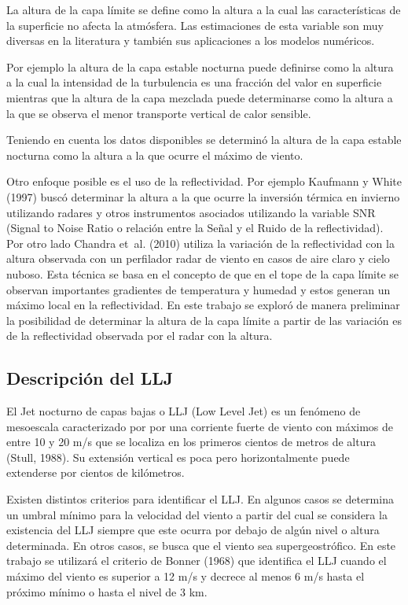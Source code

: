 \documentclass[12pt,spanish,oneside, a4paper]{book}
\begin{document}
La altura de la capa límite se define como la altura a la cual las
características de la superficie no afecta la atmósfera. Las
estimaciones de esta variable son muy diversas en la literatura y
también sus aplicaciones a los modelos numéricos.

Por ejemplo la altura de la capa estable nocturna puede definirse como
la altura a la cual la intensidad de la turbulencia es una fracción del
valor en superficie mientras que la altura de la capa mezclada puede
determinarse como la altura a la que se observa el menor transporte
vertical de calor sensible.

Teniendo en cuenta los datos disponibles se determinó la altura de la
capa estable nocturna como la altura a la que ocurre el máximo de
viento.

Otro enfoque posible es el uso de la reflectividad. Por ejemplo Kaufmann
y White (1997) buscó determinar la altura a la que ocurre la inversión
térmica en invierno utilizando radares y otros instrumentos asociados
utilizando la variable SNR (Signal to Noise Ratio o relación entre la
Señal y el Ruido de la reflectividad). Por otro lado Chandra et~al.
(2010) utiliza la variación de la reflectividad con la altura observada
con un perfilador radar de viento en casos de aire claro y cielo nuboso.
Esta técnica se basa en el concepto de que en el tope de la capa límite
se observan importantes gradientes de temperatura y humedad y estos
generan un máximo local en la reflectividad. En este trabajo se exploró
de manera preliminar la posibilidad de determinar la altura de la capa
límite a partir de las variación es de la reflectividad observada por el
radar con la altura.

\subsection{Descripción del LLJ}\label{descripcion-del-llj}

El Jet nocturno de capas bajas o LLJ (Low Level Jet) es un fenómeno de
mesoescala caracterizado por por una corriente fuerte de viento con
máximos de entre 10 y 20 m/s que se localiza en los primeros cientos de
metros de altura (Stull, 1988). Su extensión vertical es poca pero
horizontalmente puede extenderse por cientos de kilómetros.

Existen distintos criterios para identificar el LLJ. En algunos casos se
determina un umbral mínimo para la velocidad del viento a partir del
cual se considera la existencia del LLJ siempre que este ocurra por
debajo de algún nivel o altura determinada. En otros casos, se busca que
el viento sea supergeostrófico. En este trabajo se utilizará el criterio
de Bonner (1968) que identifica el LLJ cuando el máximo del viento es
superior a 12 m/s y decrece al menos 6 m/s hasta el próximo mínimo o
hasta el nivel de 3 km.
\end{document}
